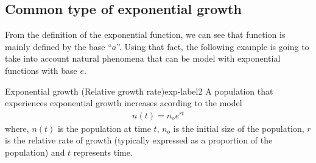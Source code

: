 \documentclass[../main.tex]{subfiles}
\begin{document}
\subsection{Common type of exponential growth}

From the definition of the exponential function, we can see that function is mainly defined by the base ``$a$''.
Using that fact, the following example is going to take into account natural phenomena that can be model with exponential functions with base $e$.

\begin{definition}{Exponential growth (Relative growth rate)}{exp-label2}
    A population that experiences exponential growth increases acording to the model
    \begin{gather*}
        n(t) = n_o e^{rt}
    \end{gather*}
    where, $n(t)$ is the population at time $t$, $n_o$ is the initial size of the population, $r$ is the relative rate of growth (typically expressed as a proportion of the population) and $t$ represents time.
\end{definition}
\end{document}
